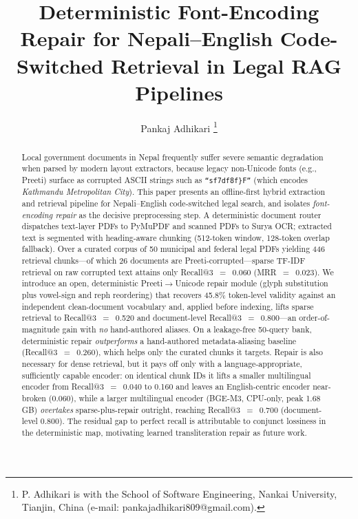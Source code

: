 \documentclass[journal]{IEEEtran}
\newcommand{\corpusDocs}{50}
\newcommand{\corpusChunks}{446}
\newcommand{\nqueries}{50}
\newcommand{\corpusCorruptDocs}{26}
\newcommand{\rawRecall}{0.060}
\newcommand{\rawMRR}{0.023}
\newcommand{\repRecall}{0.520}
\newcommand{\repDocRecall}{0.800}
\newcommand{\aliRecall}{0.260}
\newcommand{\repairValidity}{45.8}
\newcommand{\denseEnRepRecall}{0.060}
\newcommand{\denseMlRawRecall}{0.040}
\newcommand{\denseMlRepRecall}{0.160}
\newcommand{\denseBgeRepRecall}{0.700}
\newcommand{\denseBgeRepDocRecall}{0.800}
\newcommand{\densePeakRSS}{1.68}
\begin{document}
\title{Deterministic Font-Encoding Repair for Nepali--English Code-Switched Retrieval in Legal RAG Pipelines}

\author{Pankaj Adhikari%
\thanks{P. Adhikari is with the School of Software Engineering, Nankai University, Tianjin, China (e-mail: pankajadhikari809@gmail.com).}}

\maketitle

\begin{abstract}
Local government documents in Nepal frequently suffer severe semantic degradation when parsed by modern layout extractors, because legacy non-Unicode fonts (e.g., Preeti) surface as corrupted ASCII strings such as \texttt{``sf7df8f\}F''} (which encodes \emph{Kathmandu Metropolitan City}). This paper presents an offline-first hybrid extraction and retrieval pipeline for Nepali--English code-switched legal search, and isolates \emph{font-encoding repair} as the decisive preprocessing step. A deterministic document router dispatches text-layer PDFs to PyMuPDF and scanned PDFs to Surya OCR; extracted text is segmented with heading-aware chunking (512-token window, 128-token overlap fallback). Over a curated corpus of \corpusDocs{} municipal and federal legal PDFs yielding \corpusChunks{} retrieval chunks---of which \corpusCorruptDocs{} documents are Preeti-corrupted---sparse TF-IDF retrieval on raw corrupted text attains only Recall@3~$=$~\rawRecall{} (MRR~$=$~\rawMRR{}). We introduce an open, deterministic Preeti$\rightarrow$Unicode repair module (glyph substitution plus vowel-sign and reph reordering) that recovers \repairValidity{}\% token-level validity against an independent clean-document vocabulary and, applied before indexing, lifts sparse retrieval to Recall@3~$=$~\repRecall{} and document-level Recall@3~$=$~\repDocRecall{}---an order-of-magnitude gain with \emph{no} hand-authored aliases. On a leakage-free \nqueries{}-query bank, deterministic repair \emph{outperforms} a hand-authored metadata-aliasing baseline (Recall@3~$=$~\aliRecall{}), which helps only the curated chunks it targets. Repair is also necessary for dense retrieval, but it pays off only with a language-appropriate, sufficiently capable encoder: on identical chunk IDs it lifts a smaller multilingual encoder from Recall@3~$=$~\denseMlRawRecall{} to \denseMlRepRecall{} and leaves an English-centric encoder near-broken (\denseEnRepRecall{}), while a larger multilingual encoder (BGE-M3, CPU-only, peak \densePeakRSS{}\,GB) \emph{overtakes} sparse-plus-repair outright, reaching Recall@3~$=$~\denseBgeRepRecall{} (document-level \denseBgeRepDocRecall{}). The residual gap to perfect recall is attributable to conjunct lossiness in the deterministic map, motivating learned transliteration repair as future work.
\end{abstract}
\end{document}
